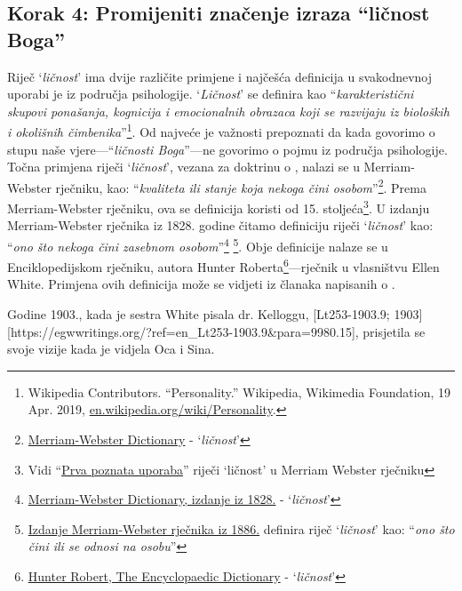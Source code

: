 \subsection*{Korak 4: Promijeniti značenje izraza “ličnost Boga”}

Riječ ‘\textit{ličnost}’ ima dvije različite primjene i najčešća definicija u svakodnevnoj uporabi je iz područja psihologije. ‘\textit{Ličnost}’ se definira kao “\textit{karakteristični skupovi ponašanja, kognicija i emocionalnih obrazaca koji se razvijaju iz bioloških i okolišnih čimbenika}”\footnote{Wikipedia Contributors. “Personality.” Wikipedia, Wikimedia Foundation, 19 Apr. 2019, \href{https://en.wikipedia.org/wiki/Personality}{en.wikipedia.org/wiki/Personality}.}. Od najveće je važnosti prepoznati da kada govorimo o stupu naše vjere—“\textit{ličnosti Boga}”—ne govorimo o pojmu iz područja psihologije. Točna primjena riječi ‘\textit{ličnost}’, vezana za doktrinu o , nalazi se u Merriam-Webster rječniku, kao: “\textit{kvaliteta ili stanje koja nekoga čini osobom}”\footnote{\href{https://www.merriam-webster.com/dictionary/personality}{Merriam-Webster Dictionary} - ‘\textit{ličnost}’}. Prema Merriam-Webster rječniku, ova se definicija koristi od 15. stoljeća\footnote{Vidi “\href{https://www.merriam-webster.com/dictionary/personality\#word-history}{Prva poznata uporaba}” riječi ‘ličnost’ u Merriam Webster rječniku}. U izdanju Merriam-Webster rječnika iz 1828. godine čitamo definiciju riječi ‘\textit{ličnost}’ kao: “\textit{ono što nekoga čini zasebnom osobom}”\footnote{\href{https://archive.org/details/americandictiona02websrich/page/272/mode/2up}{Merriam-Webster Dictionary, izdanje iz 1828.} - ‘\textit{ličnost}’} \footnote{\href{https://archive.org/details/websterscomplete00webs/page/974/mode/2up}{Izdanje Merriam-Webster rječnika iz 1886.} definira riječ ‘\textit{ličnost}’ kao: “\textit{ono što čini ili se odnosi na osobu}”}. Obje definicije nalaze se u Enciklopedijskom rječniku, autora Hunter Roberta\footnote{\href{https://babel.hathitrust.org/cgi/pt?id=mdp.39015050663213&view=1up&seq=780}{Hunter Robert, The Encyclopaedic Dictionary} - ‘\textit{ličnost}’}—rječnik u vlasništvu Ellen White. Primjena ovih definicija može se vidjeti iz članaka napisanih o .

Godine 1903., kada je sestra White pisala dr. Kelloggu, [Lt253-1903.9; 1903][https://egwwritings.org/?ref=en\_Lt253-1903.9&para=9980.15], prisjetila se svoje vizije kada je vidjela Oca i Sina.

